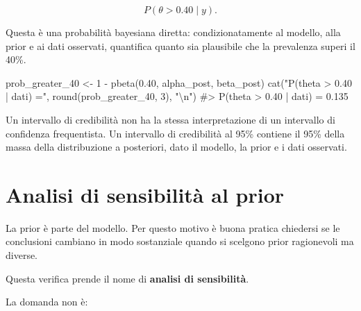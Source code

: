 \documentclass[
  italian,
  letterpaper,
  a4paper,
  11pt,
  open=any]{scrbook}
\newenvironment{Shaded}{\begin{snugshade}}{\end{snugshade}}
\newcommand{\CommentTok}[1]{\textcolor[rgb]{0.37,0.37,0.37}{#1}}
\newcommand{\DecValTok}[1]{\textcolor[rgb]{0.68,0.00,0.00}{#1}}
\newcommand{\FloatTok}[1]{\textcolor[rgb]{0.68,0.00,0.00}{#1}}
\newcommand{\FunctionTok}[1]{\textcolor[rgb]{0.28,0.35,0.67}{#1}}
\newcommand{\NormalTok}[1]{\textcolor[rgb]{0.00,0.23,0.31}{#1}}
\newcommand{\OtherTok}[1]{\textcolor[rgb]{0.00,0.23,0.31}{#1}}
\newcommand{\SpecialCharTok}[1]{\textcolor[rgb]{0.37,0.37,0.37}{#1}}
\newcommand{\StringTok}[1]{\textcolor[rgb]{0.13,0.47,0.30}{#1}}
\theoremstyle{plain}
\theoremstyle{definition}
\theoremstyle{definition}
\theoremstyle{remark}
\begin{document}
\[
P(\theta > 0.40 \mid y).
\]

Questa è una probabilità bayesiana diretta: condizionatamente al
modello, alla prior e ai dati osservati, quantifica quanto sia
plausibile che la prevalenza superi il 40\%.

\begin{Shaded}
\begin{Highlighting}[]
\NormalTok{prob\_greater\_40 }\OtherTok{\textless{}{-}} \DecValTok{1} \SpecialCharTok{{-}} \FunctionTok{pbeta}\NormalTok{(}\FloatTok{0.40}\NormalTok{, alpha\_post, beta\_post)}
\FunctionTok{cat}\NormalTok{(}\StringTok{"P(theta \textgreater{} 0.40 | dati) ="}\NormalTok{, }\FunctionTok{round}\NormalTok{(prob\_greater\_40, }\DecValTok{3}\NormalTok{), }\StringTok{"}\SpecialCharTok{\textbackslash{}n}\StringTok{"}\NormalTok{)}
\CommentTok{\#\textgreater{} P(theta \textgreater{} 0.40 | dati) = 0.135}
\end{Highlighting}
\end{Shaded}

\begin{tcolorbox}[enhanced jigsaw, arc=.35mm, bottomrule=.15mm, bottomtitle=1mm, breakable, colback=white, colbacktitle=quarto-callout-important-color!10!white, colframe=quarto-callout-important-color-frame, coltitle=black, left=2mm, leftrule=.75mm, opacityback=0, opacitybacktitle=0.6, rightrule=.15mm, title=\textcolor{quarto-callout-important-color}{\faExclamation}\hspace{0.5em}{Importante}, titlerule=0mm, toprule=.15mm, toptitle=1mm]

Un intervallo di credibilità non ha la stessa interpretazione di un
intervallo di confidenza frequentista. Un intervallo di credibilità al
95\% contiene il 95\% della massa della distribuzione a posteriori, dato
il modello, la prior e i dati osservati.

\end{tcolorbox}

\section{Analisi di sensibilità al prior}\label{sec-prior-sensitivity}

La prior è parte del modello. Per questo motivo è buona pratica
chiedersi se le conclusioni cambiano in modo sostanziale quando si
scelgono prior ragionevoli ma diverse.

Questa verifica prende il nome di \textbf{analisi di sensibilità}.

La domanda non è:
\end{document}
